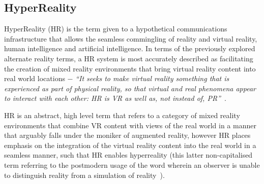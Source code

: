 
\subsection{HyperReality}
\label{subsec_HyperReality}

HyperReality (HR) is the term given to a hypothetical communications infrastructure that allows the seamless commingling of reality and virtual reality, human intelligence and artificial intelligence. In terms of the previously explored alternate reality terms, a HR system is most accurately described as facilitating the creation of mixed reality environments that bring virtual reality content into real world locations $-$ \textit{``It seeks to make virtual reality something that is experienced as part of physical reality, so that virtual and real phenomena appear to interact with each other: HR is VR as well as, not instead of, PR''}~\cite{Terashima2001}.

HR is an abstract, high level term that refers to a category of mixed reality environments that combine VR content with views of the real world in a manner that arguably falls under the moniker of augmented reality, however HR places emphasis on the integration of the virtual reality content into the real world in a seamless manner, such that HR enables hyperreality (this latter non-capitalised term referring to the postmodern usage of the word wherein an observer is unable to distinguish reality from a simulation of reality~\cite{Baudrillard1994}).





